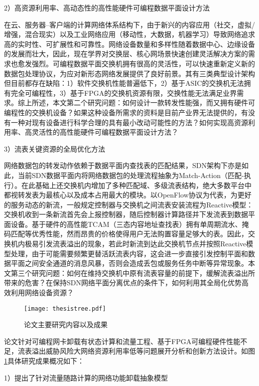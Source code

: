 2）高资源利用率、高动态性的高性能硬件可编程数据平面设计方法

在云、服务器--客户端的计算网络体系结构下，由于新兴的内容应用（社交，虚拟/增强，混合现实）以及工业网络应用（移动性，大数据，机器学习）导致网络追求高的实时性、可扩展性和可靠性。网络设备数量和多样性随着数据中心、边缘设备的发展而壮大，因此，现在学界对交换层、核心网场景快速创建灵活解决方案的需求也愈发强烈。可编程数据平面交换机拥有很高的灵活性，可以快速重新定义新的数据包处理协议，为应对新形态网络发展提供了良好前景。其有三类典型设计架构但目前都存在缺陷：1）软件交换机性能普遍低下，2）基于ASIC的交换机无法拥有完全可编程性，3）基于FPGA的交换机资源有限，交换性能无法满足业界需求。综上所述，本文第二个研究问题：如何设计一款转发性能强，而又拥有硬件可编程性的交换机设备？如果这种设备所需求的资料是目前产业界无法提供的，有没有一种对现有设备进行科学合理的具有最小改动可能性的方法？如何实现高资源利用率、高灵活性的高性能硬件可编程数据平面设计方法？

3）流表关键资源的全局优化方法

网络数据包的转发动作依赖于数据平面内查找表的匹配结果，SDN架构下亦是如此，当前SDN数据平面内将网络数据包的处理流程抽象为Match-Action（匹配-执行）。在此基础上还交换机内增加了多种匹配域、多级流表结构，绝大多数平台中都视转发表为最核心以及成本占用最大的模块。以OpenFlow协议为代表，为更好的服务动态的新流，一般规定控制器与交换机之间流表安装流程为Reactive模型：交换机收到一条新流首先会上报控制器，随后控制器计算路径并下发流表到数据平面设备。基于硬件的高性能TCAM（三态内容地址查找表）拥有单周期流水、掩码匹配等优秀性能，然而昂贵的价格使得用户无法购置容量足够大的表。因此，交换机内极易引发流表溢出的现象，若此时新流到达此交换机节点并按照Reactive模型处理，由于可能需要频繁更替活跃流表内容，这会进一步直接引发控制平面和数据平面之间安全通道的消息风暴，否则会造成丢包或服务任务中断等异常现象。本文第三个研究问题：如何在维持交换机中原有流表容量的前提下，缓解流表溢出所带来的危害？在保持SDN网络平面分离优点的条件下，如何利用其全局化优势高效利用网络设备资源？


\begin{figure}[!ht]
	\centering
	\texttt{[image: thesistree.pdf]}
	\caption{论文主要研究内容以及成果} \label{fig:thesistree}
\end{figure}

论文针对可编程网卡卸载有状态计算和流量工程、基于FPGA可编程硬件性能不足，流表溢出威胁风险大网络资源利用率低等问题展开分析和创新方法设计。如图\ref{fig:thesistree}具体研究成果概况如下：

1）提出了针对流量随路计算的网络功能卸载抽象模型

